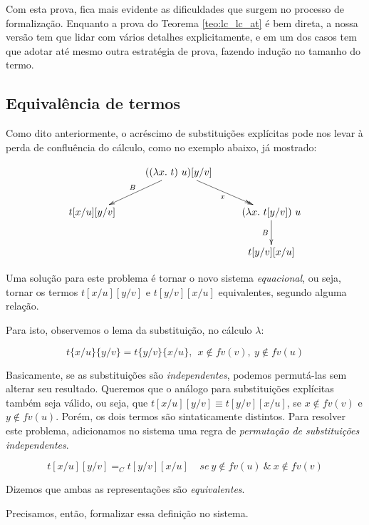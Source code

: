 Com esta prova, fica mais evidente as dificuldades que surgem no processo de
formalização. Enquanto a prova do Teorema \ref{teo:lc_lc_at} é bem direta,
a nossa versão tem que lidar com vários detalhes explicitamente, e em um dos
casos tem que adotar até mesmo outra estratégia de prova, fazendo indução no
tamanho do termo. 

\subsection{Equivalência de termos}
\label{sub:equival_ncia_de_termos}

Como dito anteriormente, o acréscimo de substituições explícitas pode nos levar
à perda de confluência do cálculo, como no exemplo abaixo, já mostrado:

\begin{displaymath}
        \xymatrix{ & ((\lambda x.\ t)\ u)[y/v] \ar[dl]_{B} \ar@{->>}[dr]_x &     \\
                  t[x/u][y/v] &               & (\lambda x.\ t[y/v])\ u \ar[d]_B \\
                              &               &  t[y/v][x/u]                    }
\end{displaymath}

Uma solução para este problema é tornar o novo sistema \emph{equacional}, ou
seja, tornar os termos $t[x/u][y/v]$ e $t[y/v][x/u]$ equivalentes, segundo
alguma relação.

Para isto, observemos o lema da substituição, no cálculo $\lambda$:

\[ t\{x/u\}\{y/v\} = t\{y/v\}\{x/u\},\ \ x \notin fv(v),\ y \notin fv(u) \]

Basicamente, se as substituições são \emph{independentes}, podemos permutá-las
sem alterar seu resultado. Queremos que o análogo para substituições explícitas
também seja válido, ou seja, que $t[x/u][y/v] \equiv t[y/v][x/u]$, se $x \notin
fv(v)$ e $y \notin fv(u)$.  Porém, os dois termos são sintaticamente distintos.
Para resolver este problema, adicionamos no sistema uma regra de
\emph{permutação de substituições independentes}.

\[ t[x/u][y/v] =_C t[y/v][x/u] \ \ \ \ \ se\ y \notin fv(u)\ \&\ x \notin fv(v)\] 

Dizemos que ambas as representações são \emph{equivalentes}.

Precisamos, então, formalizar essa definição no sistema.

